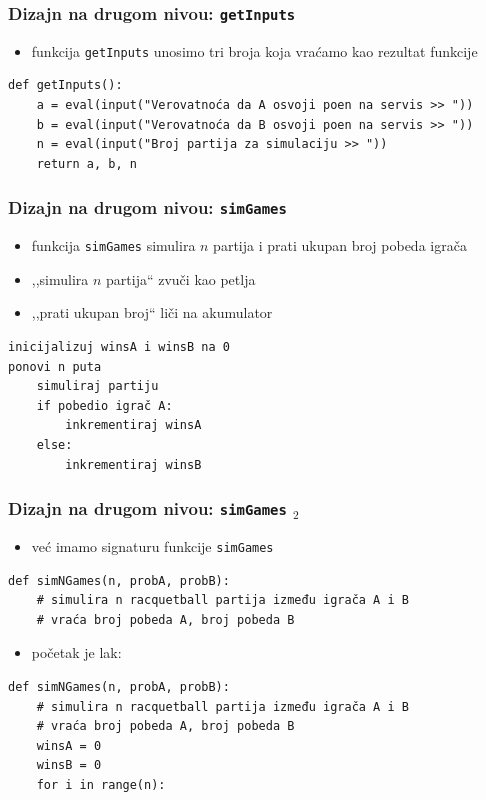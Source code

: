 \documentclass[utf8,compress]{beamer}
\begin{document}
\begin{frame}[fragile,shrink=15]
  \frametitle{Dizajn na drugom nivou: \texttt{getInputs}}
  \begin{itemize}
    \item funkcija \texttt{getInputs} unosimo tri broja koja vraćamo kao rezultat funkcije
  \end{itemize}
\begin{verbatim}
def getInputs():
    a = eval(input("Verovatnoća da A osvoji poen na servis >> "))
    b = eval(input("Verovatnoća da B osvoji poen na servis >> "))
    n = eval(input("Broj partija za simulaciju >> "))
    return a, b, n
\end{verbatim}
\end{frame}

\begin{frame}[fragile]
  \frametitle{Dizajn na drugom nivou: \texttt{simGames}}
  \begin{itemize}
    \item funkcija \texttt{simGames} simulira $n$ partija i prati ukupan broj pobeda igrača
    \item ,,simulira $n$ partija`` zvuči kao petlja
    \item ,,prati ukupan broj`` liči na akumulator
  \end{itemize}
\begin{verbatim}
inicijalizuj winsA i winsB na 0
ponovi n puta
    simuliraj partiju
    if pobedio igrač A:
        inkrementiraj winsA
    else:
        inkrementiraj winsB
\end{verbatim}
\end{frame}

\begin{frame}[fragile]
  \frametitle{Dizajn na drugom nivou: \texttt{simGames} $_2$}
  \begin{itemize}
    \item već imamo signaturu funkcije \texttt{simGames}
  \end{itemize}
\begin{verbatim}
def simNGames(n, probA, probB):
    # simulira n racquetball partija između igrača A i B
    # vraća broj pobeda A, broj pobeda B
\end{verbatim}
  \begin{itemize}
    \item početak je lak:
  \end{itemize}
\begin{verbatim}
def simNGames(n, probA, probB):
    # simulira n racquetball partija između igrača A i B
    # vraća broj pobeda A, broj pobeda B
    winsA = 0
    winsB = 0
    for i in range(n):
\end{verbatim}
\end{frame}
\end{document}
